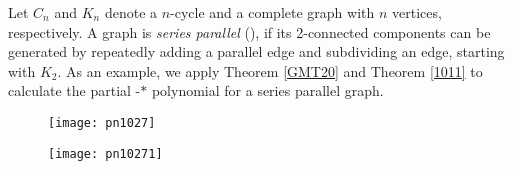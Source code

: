 Let $C_{n}$ and $K_{n}$ denote a $n$-cycle and a complete graph with $n$ vertices, respectively.  A graph is \textit{series parallel} (\cite{AVJ99}), if its 2-connected components can be generated by repeatedly  adding a parallel edge and subdividing an edge, starting with $K_{2}$. As an example, we apply Theorem \ref{GMT20} and  Theorem \ref{1011} to calculate the partial -$*$ polynomial for a series parallel graph.

\begin{figure}[h]
  \centering
  \texttt{[image: pn1027]}
   \caption{ }
 \label{pn1027}
\end{figure}
\begin{figure}[h]
  \centering
  \texttt{[image: pn10271]}
   \caption{ }
 \label{pn10271}
\end{figure}
